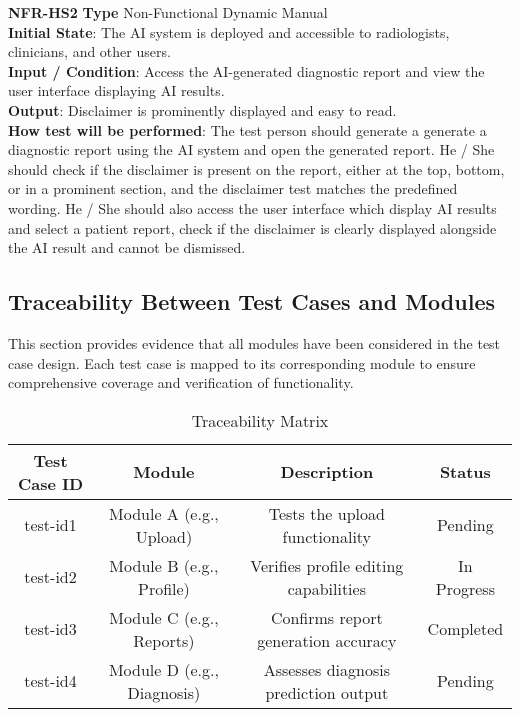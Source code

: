 \documentclass[12pt, titlepage]{article}
\begin{document}
\noindent \textbf{NFR-HS2} \textbf{Type} Non-Functional Dynamic Manual\\
        \indent \textbf{Initial State}: The AI system is deployed and accessible to radiologists, clinicians, and other users.\\
        \indent \textbf{Input / Condition}: Access the AI-generated diagnostic report and view the user interface displaying AI results.\\
        \indent \textbf{Output}: Disclaimer is prominently displayed and easy to read. \\
        \indent \textbf{How test will be performed}: The test person should generate a generate a diagnostic report using the AI system and open the generated report. He / She should check if the disclaimer is present on the report, either at the top, bottom, or in a prominent section, and the disclaimer test matches the predefined wording. He / She should also access the user interface which display AI results and select a patient report, check if the disclaimer is clearly displayed alongside the AI result and cannot be dismissed. \\

\subsection{Traceability Between Test Cases and Modules}
This section provides evidence that all modules have been considered in the test case design. Each test case is mapped to its corresponding module to ensure comprehensive coverage and verification of functionality.
\begin{landscape}
\begin{table}[h]
    \centering
    \caption{Traceability Matrix}
    \begin{tabular}{|c|c|c|c|}
        \hline
        \textbf{Test Case ID} & \textbf{Module} & \textbf{Description} & \textbf{Status} \\
        \hline
        test-id1 & Module A (e.g., Upload) & Tests the upload functionality & Pending \\
        \hline
        test-id2 & Module B (e.g., Profile) & Verifies profile editing capabilities & In Progress \\
        \hline
        test-id3 & Module C (e.g., Reports) & Confirms report generation accuracy & Completed \\
        \hline
        test-id4 & Module D (e.g., Diagnosis) & Assesses diagnosis prediction output & Pending \\
        \hline
    \end{tabular}
\end{table}
\end{landscape}
\end{document}
